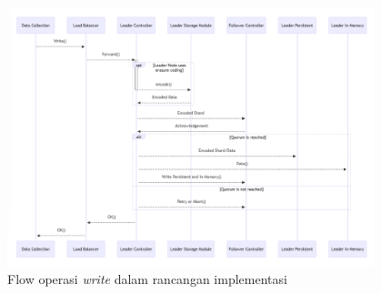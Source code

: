 \begin{figure}[!ht]
    \centering
    \includegraphics[width=0.95\textwidth]{resources/chapter-3/flow-write-mermaidjs.png}
    \caption{Flow operasi \textit{write} dalam rancangan implementasi}
    \label{fig:flow-write-mermaidjs}
\end{figure}
